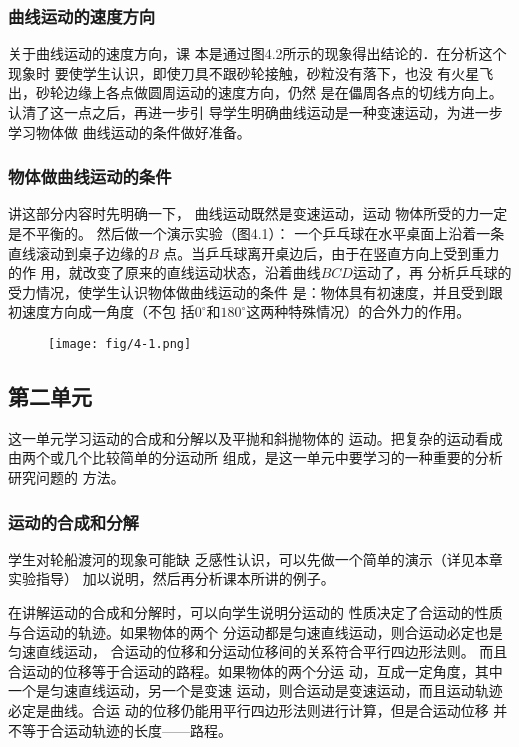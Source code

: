 \subsubsection{曲线运动的速度方向}

关于曲线运动的速度方向，课
本是通过图4.2所示的现象得出结论的．在分析这个现象时
要使学生认识，即使刀具不跟砂轮接触，砂粒没有落下，也没
有火星飞出，砂轮边缘上各点做圆周运动的速度方向，仍然
是在儡周各点的切线方向上。认清了这一点之后，再进一步引
导学生明确曲线运动是一种变速运动，为进一步学习物体做
曲线运动的条件做好准备。

\subsubsection{物体做曲线运动的条件}

讲这部分内容时先明确一下，
曲线运动既然是变速运动，运动
物体所受的力一定是不平衡的。
然后做一个演示实验（图4.1）：
一个乒乓球在水平桌面上沿着一条直线滚动到桌子边缘的$B$
点。当乒乓球离开桌边后，由于在竖直方向上受到重力的作
用，就改变了原来的直线运动状态，沿着曲线$BCD$运动了，再
分析乒乓球的受力情况，使学生认识物体做曲线运动的条件
是：物体具有初速度，并且受到跟初速度方向成一角度（不包
括$0^{\circ}$和$180^{\circ}$这两种特殊情况）的合外力的作用。

\begin{figure}[htp]
    \centering
\texttt{[image: fig/4-1.png]}
    \caption{}
\end{figure}

\subsection{第二单元}
这一单元学习运动的合成和分解以及平抛和斜抛物体的
运动。把复杂的运动看成由两个或几个比较简单的分运动所
组成，是这一单元中要学习的一种重要的分析研究问题的
方法。

\subsubsection{运动的合成和分解}

学生对轮船渡河的现象可能缺
乏感性认识，可以先做一个简单的演示（详见本章实验指导）
加以说明，然后再分析课本所讲的例子。

在讲解运动的合成和分解时，可以向学生说明分运动的
性质决定了合运动的性质与合运动的轨迹。如果物体的两个
分运动都是匀速直线运动，则合运动必定也是匀速直线运动，
合运动的位移和分运动位移间的关系符合平行四边形法则。
而且合运动的位移等于合运动的路程。如果物体的两个分运
动，互成一定角度，其中一个是匀速直线运动，另一个是变速
运动，则合运动是变速运动，而且运动轨迹必定是曲线。合运
动的位移仍能用平行四边形法则进行计算，但是合运动位移
并不等于合运动轨迹的长度——路程。

